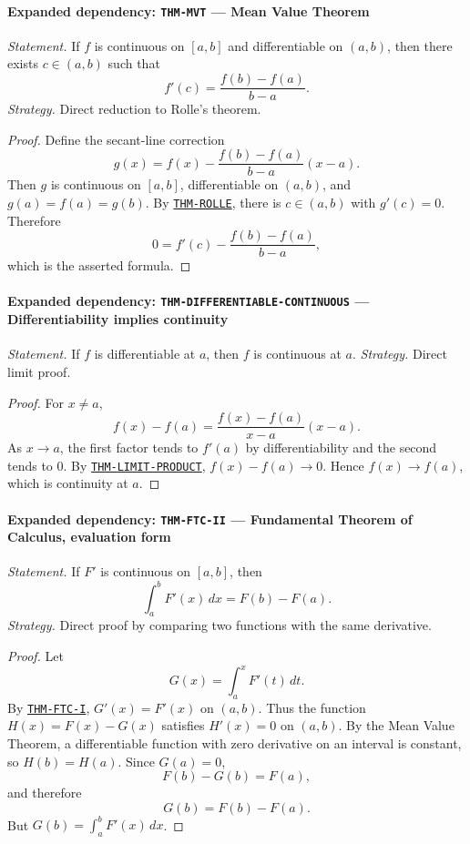 \documentclass[10pt]{article}
\newcommand{\pidraw}[1]{\begingroup\urlstyle{tt}\nolinkurl{#1}\endgroup}
\newcommand{\pidref}[1]{\hyperref[prf:#1]{\pidraw{#1}}}
\newcommand{\pid}[1]{\pidref{#1}}
\theoremstyle{definition}
\theoremstyle{remark}
\begin{document}
\paragraph{Expanded dependency: \pidraw{THM-MVT} --- Mean Value Theorem}
\textit{Statement.} If $f$ is continuous on $[a,b]$ and differentiable on $(a,b)$, then there exists $c\in(a,b)$ such that
\[
f'(c)=\frac{f(b)-f(a)}{b-a}.
\]
\textit{Strategy.} Direct reduction to Rolle's theorem.
\begin{proof}Define the secant-line correction
\[
g(x)=f(x)-\frac{f(b)-f(a)}{b-a}(x-a).
\]
Then $g$ is continuous on $[a,b]$, differentiable on $(a,b)$, and
$g(a)=f(a)=g(b)$. By \pid{THM-ROLLE}, there is $c\in(a,b)$ with $g'(c)=0$.
Therefore
\[
0=f'(c)-\frac{f(b)-f(a)}{b-a},
\]
which is the asserted formula.\end{proof}

\paragraph{Expanded dependency: \pidraw{THM-DIFFERENTIABLE-CONTINUOUS} --- Differentiability implies continuity}
\textit{Statement.} If $f$ is differentiable at $a$, then $f$ is continuous at $a$.
\textit{Strategy.} Direct limit proof.
\begin{proof}For $x\ne a$,
\[
f(x)-f(a)=
\frac{f(x)-f(a)}{x-a}(x-a).
\]
As $x\to a$, the first factor tends to $f'(a)$ by differentiability and the
second tends to $0$. By \pid{THM-LIMIT-PRODUCT},
$f(x)-f(a)\to0$. Hence $f(x)\to f(a)$, which is continuity at $a$.\end{proof}

\paragraph{Expanded dependency: \pidraw{THM-FTC-II} --- Fundamental Theorem of Calculus, evaluation form}
\textit{Statement.} If $F'$ is continuous on $[a,b]$, then
\[
\int_a^b F'(x)\,dx=F(b)-F(a).
\]
\textit{Strategy.} Direct proof by comparing two functions with the same derivative.
\begin{proof}Let
\[
G(x)=\int_a^x F'(t)\,dt.
\]
By \pid{THM-FTC-I}, $G'(x)=F'(x)$ on $(a,b)$. Thus the function
$H(x)=F(x)-G(x)$ satisfies $H'(x)=0$ on $(a,b)$. By the Mean Value Theorem,
a differentiable function with zero derivative on an interval is constant, so
$H(b)=H(a)$. Since $G(a)=0$,
\[
F(b)-G(b)=F(a),
\]
and therefore
\[
G(b)=F(b)-F(a).
\]
But $G(b)=\int_a^b F'(x)\,dx$.\end{proof}
\end{document}
